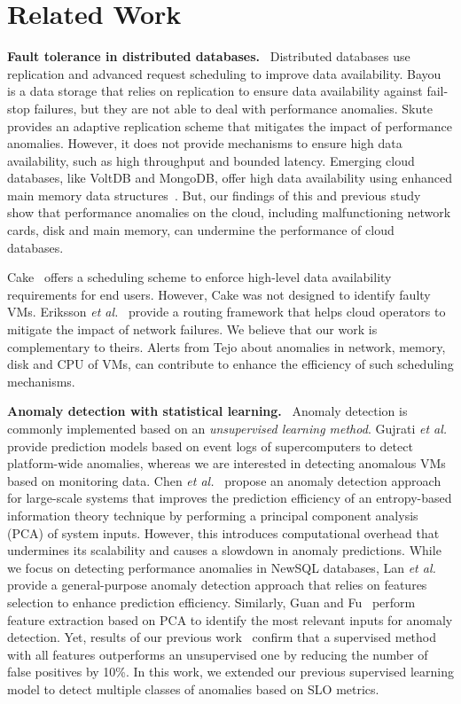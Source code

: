\section{Related Work}
\label{sec:related_work}

\noindent
{\bf Fault tolerance in distributed databases.} \ Distributed databases use replication and advanced request scheduling to improve data availability. Bayou~\cite{petersen1996bayou} is a data storage that relies on replication to ensure data availability against fail-stop failures, but they are not able to deal with performance anomalies. Skute~\cite{bonvin2010self} provides an adaptive replication scheme that mitigates the impact of performance anomalies. However, it does not provide mechanisms to ensure high data availability, such as high throughput and bounded latency. Emerging cloud databases, like VoltDB and MongoDB, offer high data availability using enhanced main memory data structures~\cite{stonebraker2010sql}. But, our findings of this and previous study~\cite{silvestre2014anomaly} show that performance anomalies on the cloud, including malfunctioning network cards, disk and main memory, can undermine the performance of cloud databases. 

Cake~\cite{wang2012cake} offers a scheduling scheme to enforce high-level data availability requirements for end users. However, Cake was not designed to identify faulty VMs. Eriksson \emph{et al.}~\cite{eriksson2013riskroute} provide a routing framework that helps cloud operators to mitigate the impact of network failures. We believe that our work is complementary to theirs. Alerts from Tejo about anomalies in network, memory, disk and CPU of VMs, can contribute to enhance the efficiency of such scheduling mechanisms.

\noindent
{\bf Anomaly detection with statistical learning.} \ Anomaly detection is commonly implemented based on an \emph{unsupervised learning method}. Gujrati \emph{et al.}~\cite{gujrati2007meta} provide prediction models based on event logs of supercomputers to detect platform-wide anomalies, whereas we are interested in detecting anomalous VMs based on monitoring data. Chen \emph{et al.}~\cite{chen2007failure} propose an anomaly detection approach for large-scale systems that improves the prediction efficiency of an entropy-based information theory technique by performing a principal component analysis (PCA) of system inputs. However, this introduces computational overhead that undermines its scalability and causes a slowdown in anomaly predictions. While we focus on detecting performance anomalies in NewSQL databases, Lan \emph{et al.}~\cite{lan2010toward} provide a general-purpose anomaly detection approach that relies on features selection to enhance prediction efficiency. Similarly, Guan and Fu~\cite{guan2013adaptive} perform feature extraction based on PCA to identify the most relevant inputs for anomaly detection. Yet, results of our previous work~\cite{silvestre2014anomaly} confirm that a supervised method with all features outperforms an unsupervised one by reducing the number of false positives by 10\%. In this work, we extended our previous supervised learning model to detect multiple classes of anomalies based on SLO metrics.

